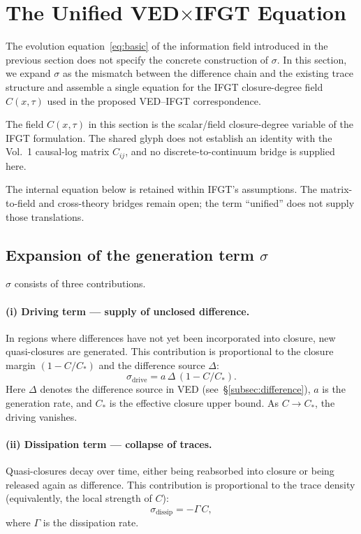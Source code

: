 \section{The Unified VED$\times$IFGT Equation}
\label{sec:unified_equation}

The evolution equation~\eqref{eq:basic} of the information field introduced in the previous section does not specify the concrete construction of $\sigma$. In this section, we expand $\sigma$ as the mismatch between the difference chain and the existing trace structure and assemble a single equation for the IFGT closure-degree field $C(x,\tau)$ used in the proposed VED--IFGT correspondence.

The field $C(x,\tau)$ in this section is the scalar/field closure-degree variable of the IFGT formulation. The shared glyph does not establish an identity with the Vol.~1 causal-log matrix $C_{ij}$, and no discrete-to-continuum bridge is supplied here.

The internal equation below is retained within IFGT's assumptions. The matrix-to-field and cross-theory bridges remain open; the term ``unified'' does not supply those translations.

\subsection{Expansion of the generation term \texorpdfstring{$\sigma$}{sigma}}
\label{subsec:sigma_expansion}

$\sigma$ consists of three contributions.

\paragraph{(i) Driving term --- supply of unclosed difference.}
In regions where differences have not yet been incorporated into closure, new quasi-closures are generated. This contribution is proportional to the closure margin $(1 - C/C_*)$ and the difference source $\Delta$:
\begin{equation}
\sigma_{\mathrm{drive}} = a \, \Delta \, \left(1 - C/C_*\right).
\label{eq:sigma_drive}
\end{equation}
Here $\Delta$ denotes the difference source in VED (see~§\ref{subsec:difference}), $a$ is the generation rate, and $C_*$ is the effective closure upper bound. As $C \to C_*$, the driving vanishes.

\paragraph{(ii) Dissipation term --- collapse of traces.}
Quasi-closures decay over time, either being reabsorbed into closure or being released again as difference. This contribution is proportional to the trace density (equivalently, the local strength of $C$):
\begin{equation}
\sigma_{\mathrm{dissip}} = -\Gamma \, C,
\label{eq:sigma_dissip}
\end{equation}
where $\Gamma$ is the dissipation rate.

